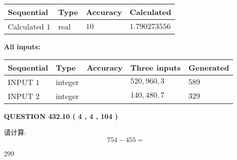 \documentclass{ctexart}
\begin{document}
   
   
   
\noindent{}
   
   
  
  
\noindent\begin{tabular}{|l|l|l|l|}
\hline
 Sequential & Type & Accuracy & Calculated \\ 
\hline
 
 
  Calculated $  1 $ & real & $  10  $ & 
 $ 1.790273556 $ 
 \\  \hline  
 \end{tabular}
   
   
   
   
\noindent\vspace{0.1in}\hspace{-0.08in} {\textbf{\Large{All inputs: }}}
   
   
  
  
\noindent\begin{tabular}{|l|l|l|l|l|}
\hline
 Sequential & Type & Accuracy & Three inputs & Generated \\ 
\hline
 
 
  INPUT $  1 $ & integer &  & $
 520
 , 
 960
 , 
 3
 $ & $ 589 $ 
 \\  \hline  
 
 
  INPUT $  2 $ & integer &  & $
 140
 , 
 480
 , 
 7
 $ & $ 329 $ 
 \\  \hline  
 \end{tabular}
   
   
  
\vspace{0.2in}
  
{\textbf{\Large{QUESTION
432.10 
 ( 4 , 4 , 104 )
}}}
  
  
 
请计算:
\begin{equation}
754 -   %
455 = \nonumber
\end{equation}
 
 
 
\noindent{}
 
 

299
 
 
\noindent{}
 
 

 
 
 
\noindent{}
 
\end{document}
